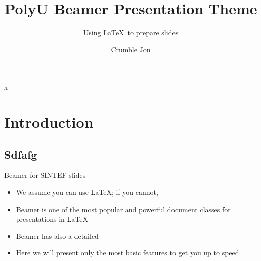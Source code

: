 \documentclass[10pt,aspectratio=169]{beamer}
\title{PolyU Beamer Presentation Theme}
\subtitle{Using \LaTeX\ to prepare slides}
\author{
	\href{mailto:ruisong20@gmail.com}
	{Crumble Jon}
}
\begin{document}
\maketitle

\begin{frame}
a
%
%
%
%
\end{frame}

\section{Introduction}

\subsection{Sdfafg}

\begin{frame}{Beamer for SINTEF slides}{\thesection \, \secname}
\begin{itemize}
\item We assume you can use \LaTeX; if you cannot,
\item Beamer is one of the most popular and powerful document
classes for presentations in \LaTeX
\item Beamer has also a detailed
\item Here we will present only the most basic features to get you up to speed
\end{itemize}
\end{frame}
\end{document}
